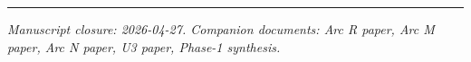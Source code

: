 \documentclass[11pt,a4paper]{article}
\begin{document}
\vspace{1em}
\noindent\rule{\linewidth}{0.4pt}
\vspace{0.2em}

\noindent\emph{Manuscript closure: 2026-04-27. Companion documents: Arc R paper, Arc M paper, Arc N paper, U3 paper, Phase-1 synthesis.}
\end{document}
